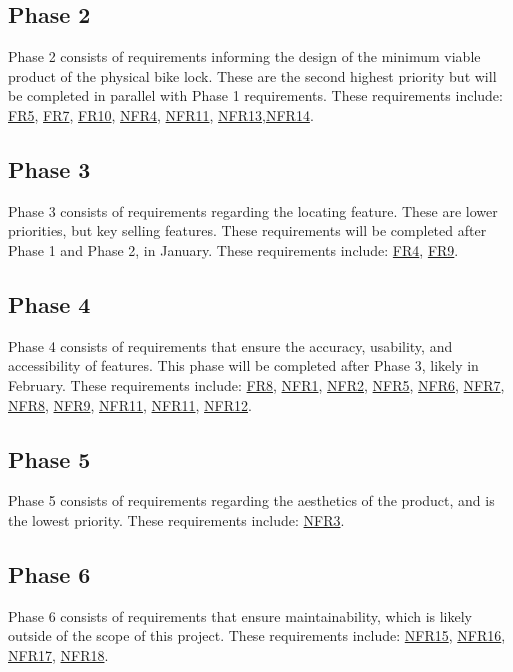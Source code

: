 \documentclass[12pt]{article}
\begin{document}
\subsection{Phase 2}
Phase 2 consists of requirements informing the design of the minimum viable product of the physical bike lock. These are the second highest priority but will be completed in parallel with Phase 1 requirements. These requirements include:
\hyperref[FRSturdy]{FR5}, \hyperref[FRBikeFrame]{FR7}, \hyperref[FRPower]{FR10}, \hyperref[NFRFunc]{NFR4}, \hyperref[NFRBatteryLife]{NFR11}, \hyperref[NFRTools]{NFR13},\hyperref[NFRModels]{NFR14}.

\subsection{Phase 3}
Phase 3 consists of requirements regarding the locating feature. These are lower priorities, but key selling features. These requirements will be completed after Phase 1 and Phase 2, in January. These requirements include:
\hyperref[FRUserPos]{FR4}, \hyperref[FRLocDisplay]{FR9}.

\subsection{Phase 4}
Phase 4 consists of requirements that ensure the accuracy, usability, and accessibility of features. This phase will be completed after Phase 3, likely in February. These requirements include:
\hyperref[FRBatteryLevelDisplay]{FR8}, \hyperref[NFRInst]{NFR1}, \hyperref[NFRStor]{NFR2},  \hyperref[NFRHarm]{NFR5}, \hyperref[NFRAccuracyStatus]{NFR6}, \hyperref[NFRAccuracyPos]{NFR7}, \hyperref[NFRBatteryLevel]{NFR8}, \hyperref[NFRCompQuick]{NFR9}, \hyperref[NFRBatteryLife]{NFR11}, \hyperref[NFRBatteryLife]{NFR11}, \hyperref[NFRBatteryAccess]{NFR12}.

\subsection{Phase 5}
Phase 5 consists of requirements regarding the aesthetics of the product, and is the lowest priority. These requirements include: \hyperref[NFRVisual]{NFR3}.

\subsection{Phase 6}
Phase 6 consists of requirements that ensure maintainability, which is likely outside of the scope of this project. These requirements include: \hyperref[NFRGUI]{NFR15}, \hyperref[NFRController]{NFR16}, \hyperref[NFRCircuit]{NFR17}, \hyperref[NFRMech]{NFR18}.
\end{document}
